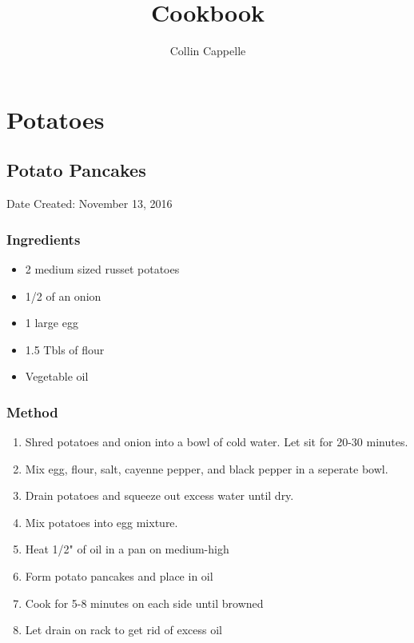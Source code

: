 \documentclass[11pt]{article}
\title{Cookbook}
\author{Collin Cappelle}
\begin{document}
\maketitle
\pagebreak
\tableofcontents
\pagebreak

\section{Potatoes}
\subsection{Potato Pancakes}
Date Created: November 13, 2016

\subsubsection*{Ingredients}
\begin{itemize}
	\item 2 medium sized russet potatoes
	\item 1/2 of an onion
	\item 1 large egg
	\item 1.5 Tbls of flour
	\item Vegetable oil
\end{itemize}
\subsubsection*{Method}
\begin{enumerate}
	\item Shred potatoes and onion into a bowl of cold water. Let sit for 20-30 minutes.
	\item Mix egg, flour, salt, cayenne pepper, and black pepper in a seperate bowl.
	\item Drain potatoes and squeeze out excess water until dry.
	\item Mix potatoes into egg mixture.
	\item Heat 1/2" of oil in a pan on medium-high
	\item Form potato pancakes and place in oil
	\item Cook for 5-8 minutes on each side until browned
	\item Let drain on rack to get rid of excess oil
\end{enumerate}
\end{document}
